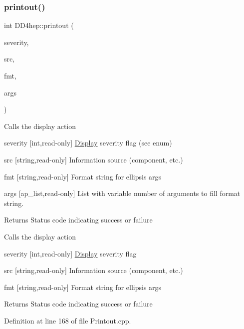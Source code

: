 \hypertarget{namespace_d_d4hep_a3c8456e0ca02e7299e7bcd0480316eaa}{}\label{namespace_d_d4hep_a3c8456e0ca02e7299e7bcd0480316eaa} 
\subsubsection{\texorpdfstring{printout()}{printout()}\hspace{0.1cm}{\footnotesize\ttfamily [6/8]}}
{\footnotesize\ttfamily int D\+D4hep\+::printout (\begin{DoxyParamCaption}\item[{\hyperlink{namespace_d_d4hep_a5b5a64d56252469451f2020a27d57d42}{Print\+Level}}]{severity,  }\item[{const std\+::string \&}]{src,  }\item[{const char $\ast$}]{fmt,  }\item[{va\+\_\+list \&}]{args }\end{DoxyParamCaption})}

Calls the display action \begin{DoxyItemize}
\item severity \mbox{[}int,read-\/only\mbox{]} \hyperlink{class_d_d4hep_1_1_display}{Display} severity flag (see enum) \item src \mbox{[}string,read-\/only\mbox{]} Information source (component, etc.) \item fmt \mbox{[}string,read-\/only\mbox{]} Format string for ellipsis args \item args \mbox{[}ap\+\_\+list,read-\/only\mbox{]} List with variable number of arguments to fill format string. \begin{DoxyReturn}{Returns}
Status code indicating success or failure
\end{DoxyReturn}
Calls the display action \item severity \mbox{[}int,read-\/only\mbox{]} \hyperlink{class_d_d4hep_1_1_display}{Display} severity flag \item src \mbox{[}string,read-\/only\mbox{]} Information source (component, etc.) \item fmt \mbox{[}string,read-\/only\mbox{]} Format string for ellipsis args \begin{DoxyReturn}{Returns}
Status code indicating success or failure 
\end{DoxyReturn}
\end{DoxyItemize}


Definition at line 168 of file Printout.\+cpp.




